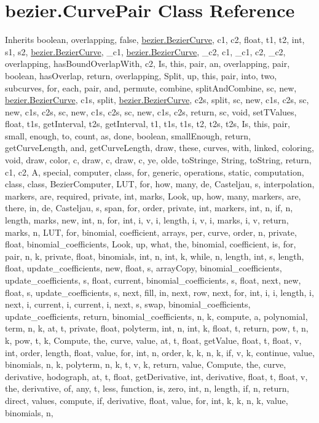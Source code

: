 \hypertarget{classbezier_1_1_curve_pair}{}\section{bezier.\+Curve\+Pair Class Reference}
\label{classbezier_1_1_curve_pair}


Inherits boolean, overlapping, false, \hyperlink{classbezier_1_1_bezier_curve}{bezier.\+Bezier\+Curve}, c1, c2, float, t1, t2, int, s1, s2, \hyperlink{classbezier_1_1_bezier_curve}{bezier.\+Bezier\+Curve}, \+\_\+c1, \hyperlink{classbezier_1_1_bezier_curve}{bezier.\+Bezier\+Curve}, \+\_\+c2, c1, \+\_\+c1, c2, \+\_\+c2, overlapping, has\+Bound\+Overlap\+With, c2, Is, this, pair, an, overlapping, pair, boolean, has\+Overlap, return, overlapping, Split, up, this, pair, into, two, subcurves, for, each, pair, and, permute, combine, split\+And\+Combine, sc, new, \hyperlink{classbezier_1_1_bezier_curve}{bezier.\+Bezier\+Curve}, c1s, split, \hyperlink{classbezier_1_1_bezier_curve}{bezier.\+Bezier\+Curve}, c2s, split, sc, new, c1s, c2s, sc, new, c1s, c2s, sc, new, c1s, c2s, sc, new, c1s, c2s, return, sc, void, set\+T\+Values, float, t1s, get\+Interval, t2s, get\+Interval, t1, t1s, t1s, t2, t2s, t2s, Is, this, pair, small, enough, to, count, as, done, boolean, small\+Enough, return, get\+Curve\+Length, and, get\+Curve\+Length, draw, these, curves, with, linked, coloring, void, draw, color, c, draw, c, draw, c, ye, olde, to\+Stringe, String, to\+String, return, c1, c2, A, special, computer, class, for, generic, operations, static, computation, class, class, Bezier\+Computer, L\+U\+T, for, how, many, de, Casteljau, s, interpolation, markers, are, required, private, int, marks, Look, up, how, many, markers, are, there, in, de, Casteljau, s, span, for, order, private, int, markers, int, n, if, n, length, marks, new, int, n, for, int, i, v, i, length, i, v, i, marks, i, v, return, marks, n, L\+U\+T, for, binomial, coefficient, arrays, per, curve, order, n, private, float, binomial\+\_\+coefficients, Look, up, what, the, binomial, coefficient, is, for, pair, n, k, private, float, binomials, int, n, int, k, while, n, length, int, s, length, float, update\+\_\+coefficients, new, float, s, array\+Copy, binomial\+\_\+coefficients, update\+\_\+coefficients, s, float, current, binomial\+\_\+coefficients, s, float, next, new, float, s, update\+\_\+coefficients, s, next, fill, in, next, row, next, for, int, i, i, length, i, next, i, current, i, current, i, next, s, swap, binomial\+\_\+coefficients, update\+\_\+coefficients, return, binomial\+\_\+coefficients, n, k, compute, a, polynomial, term, n, k, at, t, private, float, polyterm, int, n, int, k, float, t, return, pow, t, n, k, pow, t, k, Compute, the, curve, value, at, t, float, get\+Value, float, t, float, v, int, order, length, float, value, for, int, n, order, k, k, n, k, if, v, k, continue, value, binomials, n, k, polyterm, n, k, t, v, k, return, value, Compute, the, curve, derivative, hodograph, at, t, float, get\+Derivative, int, derivative, float, t, float, v, the, derivative, of, any, t, less, function, is, zero, int, n, length, if, n, return, direct, values, compute, if, derivative, float, value, for, int, k, k, n, k, value, binomials, n, 